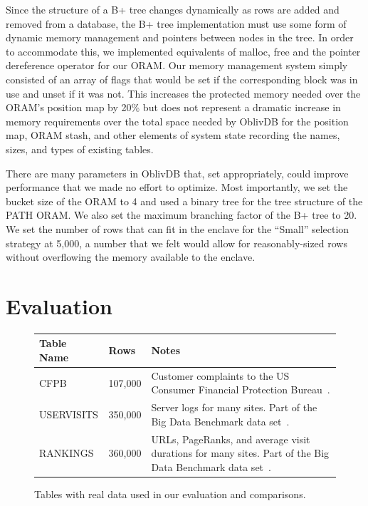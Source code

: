 \documentclass[letterpaper,twocolumn,10pt]{article}
\def\name/{OblivDB}
\begin{document}
Since the structure of a B+ tree changes dynamically as rows are added and removed from a database, the B+ tree implementation must use some form of dynamic memory management and pointers between nodes in the tree. In order to accommodate this, we implemented equivalents of malloc, free and the pointer dereference operator for our ORAM. Our memory management system simply consisted of an array of flags that would be set if the corresponding block was in use and unset if it was not. This increases the protected memory needed over the ORAM's position map by 20\% but does not represent a dramatic increase in memory requirements over the total space needed by \name/ for the position map, ORAM stash, and other elements of system state recording the names, sizes, and types of existing tables. 

There are many parameters in \name/ that, set appropriately, could improve performance that we made no effort to optimize. Most importantly, we set the bucket size of the ORAM to 4 and used a binary tree for the tree structure of the PATH ORAM. We also set the maximum branching factor of the B+ tree to 20. We set the number of rows that can fit in the enclave for the ``Small'' selection strategy at 5,000, a number that we felt would allow for reasonably-sized rows without overflowing the memory available to the enclave. 

\section{Evaluation}\label{eval}
\begin{figure}
\small
\centering
\begin{tabular}{llp{3.1cm}}
\textbf{Table Name} & \textbf{Rows} & \textbf{Notes} \\\hline\rule{0pt}{2ex}
CFPB & 107,000 & Customer complaints to the US Consumer Financial Protection Bureau~\cite{CFPB}.\\
USERVISITS & 350,000 & Server logs for many sites. Part of the Big Data Benchmark data set~\cite{BDB}.\\
RANKINGS & 360,000 & URLs, PageRanks, and average visit durations for many sites. Part of the Big Data Benchmark data set~\cite{BDB}.\\
\end{tabular}
\caption{Tables with real data used in our evaluation and comparisons.}
\end{figure}
\end{document}
